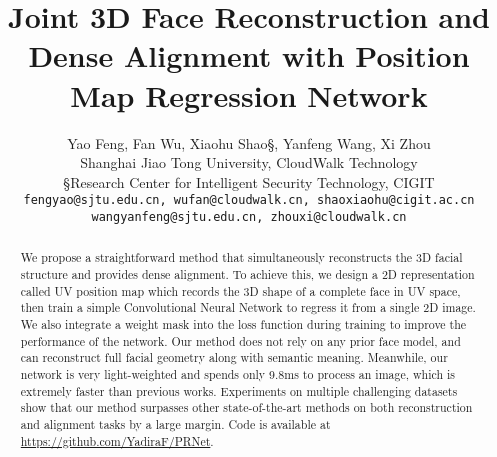 \documentclass[runningheads]{llncs}
\begin{document}
\pagestyle{headings}
\mainmatter
\def\ECCV18SubNumber{2289}  

\title{Joint 3D Face Reconstruction and Dense Alignment with Position Map Regression Network} 



\vspace{-3mm}
\author{
	Yao Feng\dag, Fan Wu\ddag, Xiaohu Shao\S, Yanfeng Wang\dag, Xi Zhou\ddag\dag \vspace*{-1mm}\\
{\normalsize \dag Shanghai Jiao Tong University, \ddag CloudWalk Technology}\\{\normalsize \S Research Center for Intelligent Security Technology, CIGIT} \\{\normalsize \texttt{fengyao@sjtu.edu.cn, wufan@cloudwalk.cn, shaoxiaohu@cigit.ac.cn}} \vspace*{-1mm}\\
	{\normalsize \texttt{wangyanfeng@sjtu.edu.cn, zhouxi@cloudwalk.cn}}
\vspace*{-2mm}}
\institute{\vspace*{-4mm}}

 
\maketitle
\vspace{-2mm}

\begin{abstract} 



We propose a straightforward method that simultaneously reconstructs the 3D facial structure and provides dense alignment. 
To achieve this, we design a 2D representation called UV position map which records the 3D shape of a complete face in UV space, then train a simple Convolutional Neural Network to regress it from a single 2D image. We also integrate a weight mask into the loss function during training to improve the performance of the network. 
Our method does not rely on any prior face model, and can reconstruct full facial geometry along with semantic meaning.
Meanwhile, our network is very light-weighted and spends only 9.8ms to process an image, which is extremely faster than previous works.
Experiments on multiple challenging datasets show that our method surpasses other state-of-the-art methods on both reconstruction and alignment tasks by a large margin.
Code is available at \url{https://github.com/YadiraF/PRNet}.
\end{abstract}
\end{document}
